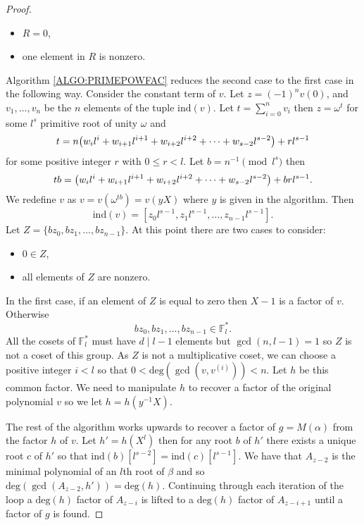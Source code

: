 \documentclass{article}
\let\originalleft\left
\let\originalright\right
\renewcommand{\left}{\mathopen{}\mathclose\bgroup\originalleft}
\renewcommand{\right}{\aftergroup\egroup\originalright}
\theoremstyle{plain}
\theoremstyle{definition}
\def\deg {{ \mathrm{deg}}}
\def\ind {{ \mathrm{ind} }}
\begin{document}
\begin{proof}
		    \begin{itemize}
		        \item $R=0$, 
		        \item one element in $R$ is nonzero.
		    \end{itemize}
		    Algorithm \ref{ALGO:PRIMEPOWFAC} reduces the second case to the first case in the following way. Consider the constant term of $v$. Let $z=(-1)^n v(0)$, and $v_1,\ldots,v_n$ be the $n$ elements of the tuple $\ind(v)$. Let $t=\sum_{i=0}^n{v_i}$ then $z=\omega^{t}$ for some $l^s$ primitive root of unity $\omega$ and 
		    \[ t=n \left( w_{i}l^{i} + w_{i+1}l^{i+1} + w_{i+2}l^{i+2} + \cdots +  w_{s-2}l^{s-2} \right) + rl^{s-1} \]
		    for some positive integer $r$ with $0 \leq r<l$. Let $b=n^{-1} \pmod {l^s}$ then 
		    \[ tb= \left( w_{i}l^{i} + w_{i+1}l^{i+1} + w_{i+2}l^{i+2} + \cdots +  w_{s-2}l^{s-2} \right) + brl^{s-1}. \]		
		    We redefine $v$ as $v=v(\omega^{tb})=v(yX)$ where $y$ is given in the algorithm. Then 
				\[ \ind(v) =[ z_0l^{s-1}, z_1l^{s-1}, \ldots, z_{n-1}l^{s-1} ]. \]
				Let $Z = \{ bz_0,bz_1,\ldots,bz_{n-1} \}$. At this point there are two cases to consider:
		    \begin{itemize}
		        \item $0 \in Z$,
		        \item all elements of $Z$ are nonzero.
		    \end{itemize}		
		    In the first case, if an element of $Z$ is equal to zero then $X-1$ is a factor of $v$. Otherwise 
				\[ bz_0,bz_1,\ldots,bz_{n-1} \in \mathbb{F}^{*}_l.\]
				All the cosets of $\mathbb{F}^{*}_l$ must have $d \mid l-1$ elements but $\gcd(n,l-1)=1$ so $Z$ is not a coset of this group. As $Z$ is not a multiplicative coset, we can choose a positive integer $i<l$ so that $0< \deg(\gcd(v,v^{(i)})) <n$. Let $h$ be this common factor. We need to manipulate $h$ to recover a factor of the original polynomial $v$ so we let $h=h(y^{-1}X)$. 
				
				The rest of the algorithm works upwards to recover a factor of $g=M(\alpha)$ from the factor $h$ of $v$. Let $h'=h(X^l) $ then for any root $b$ of $h'$ there exists a unique root $c$ of $h'$ so that $\ind(b)[l^{s-2}]=\ind(c)[l^{s-1}]$. We have that $A_{z-2}$ is the minimal polynomial of an $l$th root of $\beta$ and so $\deg(\gcd( A_{z-2},h'))=\deg(h)$. Continuing through each iteration of the loop a $\deg(h)$ factor of $A_{z-i}$ is lifted to a $\deg(h)$ factor of $A_{z-i+1}$ until a factor of $g$ is found.
		\end{proof}
		
\end{document}
